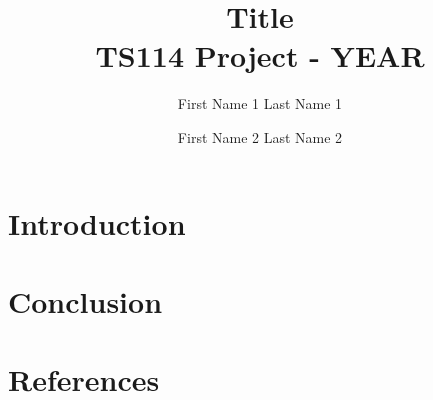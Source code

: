 \documentclass[a4paper]{article}
\title{Title\\
TS114 Project - YEAR
}
\author{First Name 1 Last Name 1 \and First Name 2 Last Name 2}
\date{}
\begin{document}
\maketitle   %

\tableofcontents %

\section{Introduction}             

\section{Conclusion}

\section{References}
\end{document}
